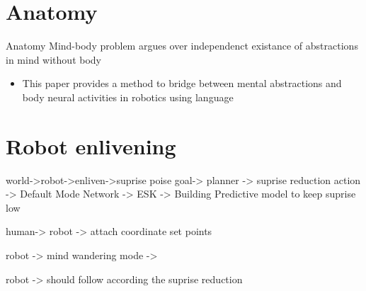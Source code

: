 \section{Anatomy}
    \begin{frame}{Anatomy}
        Mind-body problem argues over independenct existance of abstractions in mind without body \cite{georgiev-2020-quantum-information-theoretic-approach-to-the-mind-brain-problem}
        
        \begin{itemize}
            \item This paper provides a method to bridge between mental abstractions and body neural activities in robotics using language
        \end{itemize}
        
        
        \section{Robot enlivening}
            world->robot->enliven->suprise poise goal-> planner -> suprise reduction action -> Default Mode Network -> ESK -> Building Predictive model to keep suprise low
            
            human-> robot -> attach coordinate set points
            
            robot -> mind wandering mode \cite{mason-2007-wandering-minds-the-default-network-and-stimulus-independent-thought} ->
            
            robot -> should follow according the suprise reduction
    
    \end{frame}
    
    \subsection{}
        
        
